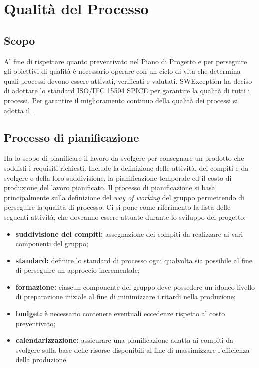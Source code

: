 \section{Qualità del Processo} \label{_qualitaProcesso}
\subsection{Scopo}
Al fine di rispettare quanto preventivato nel Piano di Progetto e per perseguire gli obiettivi di qualità è necessario operare con un ciclo di vita che determina quali processi
devono essere attivati, verificati e valutati. SWException ha deciso di adottare lo standard ISO/IEC 15504 SPICE per garantire la qualità di tutti i processi.
Per garantire il miglioramento continuo della qualità dei processi si adotta il \textit{}.

\subsection{Processo di pianificazione}
Ha lo scopo di pianificare il lavoro da svolgere per consegnare un prodotto che soddisfi i requisiti richiesti. Include la definizione delle attività, dei compiti e da svolgere
e della loro suddivisione, la pianificazione temporale ed il costo di produzione del lavoro pianificato.
Il processo di pianificazione si basa principalmente sulla definizione del \textit{way of working} del gruppo permettendo di perseguire la qualità di processo.
Ci si pone come riferimento la lista delle seguenti attività, che dovranno essere attuate durante lo sviluppo del progetto:

\begin{itemize}
    \item \textbf{suddivisione dei compiti:} assegnazione dei compiti da realizzare ai vari componenti del gruppo;
    \item \textbf{standard:} definire lo standard di processo ogni qualvolta sia possibile al fine di perseguire un approccio incrementale;
    \item \textbf{formazione:} ciascun componente del gruppo deve possedere un idoneo  livello di preparazione iniziale al fine di minimizzare i ritardi nella produzione;
    \item \textbf{budget:} è necessario contenere eventuali eccedenze rispetto al costo preventivato;
    \item \textbf{calendarizzazione:} assicurare una pianificazione adatta ai compiti da svolgere sulla base delle risorse disponibili al fine di massimizzare l'efficienza della produzione.
\end{itemize}

